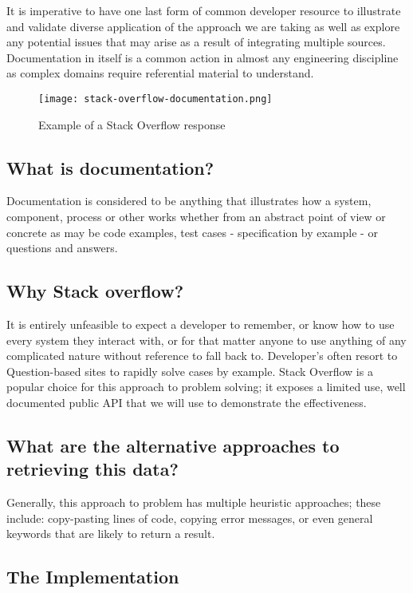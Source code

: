It is imperative to have one last form of common developer resource to illustrate and validate diverse application of the approach we are taking as well as explore any potential issues that may arise as a result of integrating multiple sources. Documentation in itself is a common action in almost any engineering discipline as complex domains require referential material to understand.

\begin{figure}[h!]
	\centering
	\texttt{[image: stack-overflow-documentation.png]}
	\caption{Example of a Stack Overflow response}
	\label{fig:stackOverflowDocSite}
\end{figure}

\subsection{What is documentation?}

Documentation is considered to be anything that illustrates how a system, component, process or other works whether from an abstract point of view or concrete as may be code examples, test cases - specification by example - or questions and answers.

\subsection{Why Stack overflow?}

It is entirely unfeasible to expect a developer to remember, or know how to use every system they interact with, or for that matter anyone to use anything of any complicated nature without reference to fall back to. Developer's often resort to Question-based sites to rapidly solve cases by example. Stack Overflow is a popular choice for this approach to problem solving; it exposes a limited use, well documented public API that we will use to demonstrate the effectiveness.

\subsection{What are the alternative approaches to retrieving this data?}

Generally, this approach to problem has multiple heuristic approaches; these include: copy-pasting lines of code, copying error messages, or even general keywords that are likely to return a result. 

\subsection{The Implementation}

